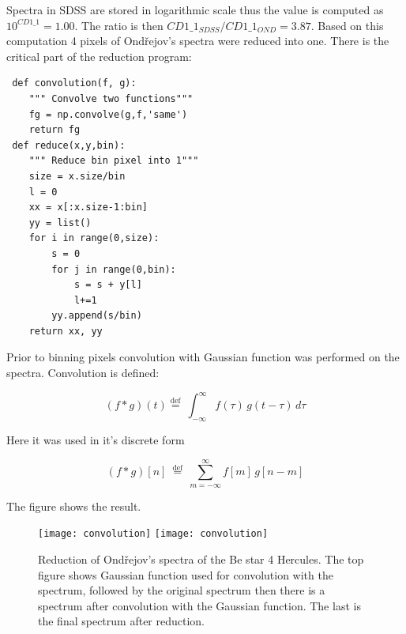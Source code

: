 Spectra in SDSS are stored in logarithmic scale thus the value is
computed as $ 10^{CD1\_1} = 1.00$. The ratio is then
$CD1\_1_{SDSS}/CD1\_1_{OND} = 3.87$. Based on this computation 4
pixels of Ondřejov's spectra were reduced into one. There is the
critical part of the reduction program:

\begin{lstlisting}
 def convolution(f, g):
    """ Convolve two functions"""
    fg = np.convolve(g,f,'same')
    return fg
 def reduce(x,y,bin):
    """ Reduce bin pixel into 1"""
    size = x.size/bin
    l = 0
    xx = x[:x.size-1:bin]
    yy = list()
    for i in range(0,size):
        s = 0
        for j in range(0,bin):
            s = s + y[l]
            l+=1
        yy.append(s/bin)
    return xx, yy
\end{lstlisting}

Prior to binning pixels convolution with Gaussian function was
performed on the spectra. Convolution is defined:

\begin{equation}
  \label{eq:convolution}
 (f * g )(t) \stackrel{\mathrm{def}}{=}\ \int_{-\infty}^{\infty} f(\tau)\, g(t - \tau)\, d\tau
\end{equation}
 
Here it was used in it's discrete form

\begin{equation}
  \label{eq:discreteConvolution}
  (f * g)[n]\ \stackrel{\mathrm{def}}{=}\ \sum_{m=-\infty}^{\infty} f[m]\, g[n - m]
\end{equation}



The figure shows the result.


    \begin{figure}[!htbp]
      \begin{center}
        \leavevmode
        \ifpdf
        \texttt{[image: convolution]}
        \else
        \texttt{[image: convolution]}
        \fi
        \caption{Reduction of Ondřejov's spectra of the Be star 4
          Hercules. The top figure shows Gaussian function used for
          convolution with the spectrum, followed by the original
          spectrum then there is a spectrum after convolution with the
          Gaussian function. The last is the final spectrum after
          reduction.}
        \label{FigReduction}
      \end{center}
    \end{figure}

\clearpage





